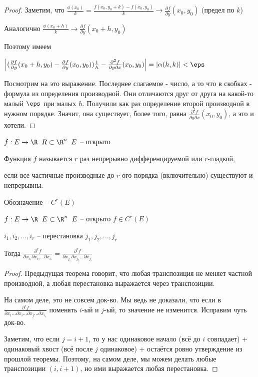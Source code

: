 \begin{proof}
	Заметим, что $\frac{\phi(x_0)}{k} = \frac{f(x_0, y_0 + k) - f(x_0, y_0)}{k}\to \frac{\partial f}{\partial y}(x_0, y_0)$ (предел по $k$)

	Аналогично $\frac{\phi(x_0+h)}{k}\to \frac{\partial f}{\partial y}(x_0+h, y_0)$

	Поэтому имеем

	$\left|(\frac{\partial f}{\partial y}(x_0+h, y_0)-\frac{\partial f}{\partial y}(x_0, y_0))\frac{1}{h} - \frac{\partial^2 f}{\partial y \partial x} (x_0, y_0 )\right|=|\alpha(h, k)|<\eps$

	Посмотрим на это выражение. Последнее слагаемое - число, а то что в скобках - формула из определения производной. Они отличаются друг от друга на какой-то малый $\eps$ при малых $h$. Получили как раз определение второй производной в нужном порядке. Значит, она существует, более того, равна $\frac{\partial^2 f}{\partial y \partial x} (x_0, y_0 )$, а это и хотели.
\end{proof}

\begin{definition}\slashns
	
	$f: E \to \R \;\; R\subset \R^n \;\; E$ -- открыто
	
	Функция $f$ называется $r$ раз непрерывно дифференцируемой или $r$-гладкой,
	
	если все частичные производные до $r$-ого порядка (включительно) существуют и непрерывны.
	
	Обозначение -- $C^r(E)$
\end{definition}

\begin{theorem}\slashns
	
	$f: E \to \R \;\; E \subset \R^n \;\; E$ -- открыто $f \in C^r(E)$
	
	$i_1, i_2, ...,i_r$ -- перестановка $j_1, j_2, ... , j_r$
	
	Тогда $\frac{\partial^r f}{\partial x_{i_1} \partial x_{i_2}...\partial x_{i_r}  } = \frac{\partial^r f}{\partial x_{j_1} \partial x_{j_2}...\partial x_{j_r}  }$
\end{theorem}

\begin{proof}\slashns
	
	Предыдущая теорема говорит, что любая транспозиция не меняет частной производной, а любая перестановка выражается через транспозиции. 

	На самом деле, это не совсем док-во. Мы ведь не доказали, что если в
	$\frac{\partial^r f}{\partial x_1... \partial x_i...\partial x_j...\partial x_{i_r}  }$ поменять $i$-ый и $j$-ый, то значение не изменится. Исправим чуть док-во.

	Заметим, что если $j=i+1$, то у нас одинаковое начало (всё до $i$ совпадает) + одинаковый хвост (всё после $j$ одинаковое) + остаётся ровно утверждение из прошлой теоремы. Поэтому, на самом деле, мы можем делать любые транспозиции $(i, i+1)$, но ими выражается любая перестановка.
\end{proof}

